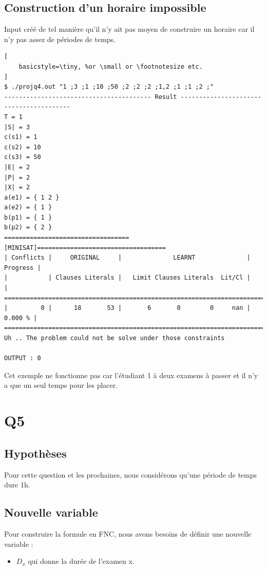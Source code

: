 \documentclass[a4paper,11pt]{article}
\begin{document}
\subsection{Construction d'un horaire impossible}
Input créé de tel manière qu'il n'y ait pas moyen de construire un horaire car il n'y pas assez de périodes de temps.
\begin{lstlisting}[
    basicstyle=\tiny, %or \small or \footnotesize etc.
]
$ ./projq4.out "1 ;3 ;1 ;10 ;50 ;2 ;2 ;2 ;1,2 ;1 ;1 ;2 ;"
---------------------------------------- Result ----------------------------------------
T = 1
|S| = 3
c(s1) = 1
c(s2) = 10
c(s3) = 50
|E| = 2
|P| = 2
|X| = 2
a(e1) = { 1 2 }
a(e2) = { 1 }
b(p1) = { 1 }
b(p2) = { 2 }
==================================[MINISAT]===================================
| Conflicts |     ORIGINAL     |              LEARNT              | Progress |
|           | Clauses Literals |   Limit Clauses Literals  Lit/Cl |          |
==============================================================================
|         0 |      18       53 |       6       0        0     nan |  0.000 % |
==============================================================================
Uh .. The problem could not be solve under those constraints

OUTPUT : 0
\end{lstlisting}
Cet exemple ne fonctionne pas car l'étudiant 1 à deux examens à passer et il n'y a que un seul temps pour les placer.

\section{Q5}

\subsection{Hypothèses}
Pour cette question et les prochaines, nous considérons qu'une période de temps dure 1h.

\subsection{Nouvelle variable}

Pour construire la formule en FNC, nous avons besoins de définir une nouvelle variable :  
\begin{itemize}
	\item \( D_{x}\) qui donne la durée de l'examen x.
\end{itemize}
\end{document}
